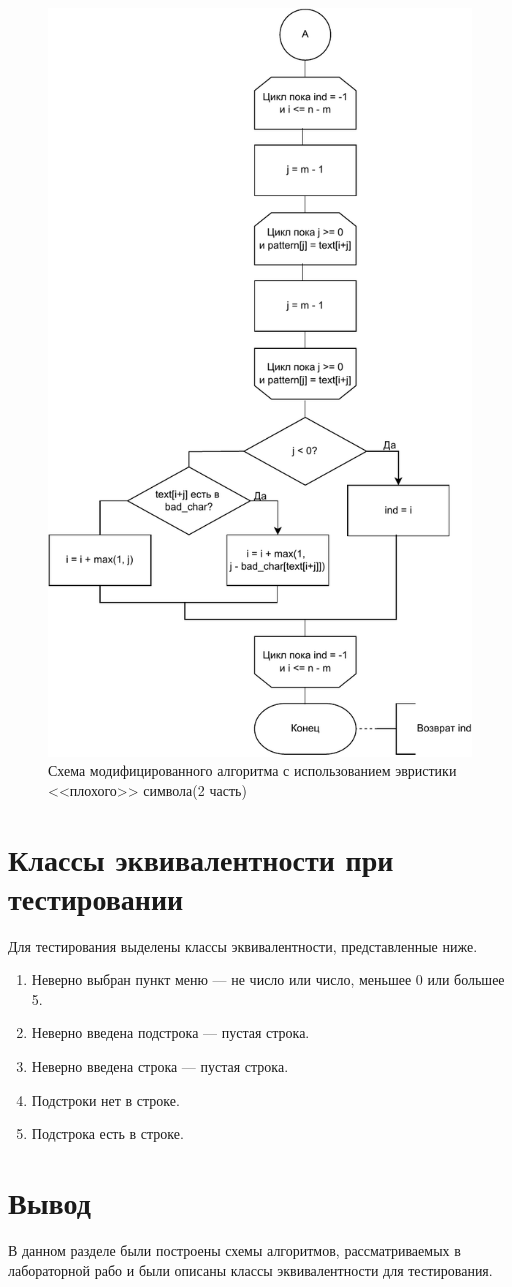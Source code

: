 \begin{figure}[h!]
	\centering
	\includegraphics[width=0.8\linewidth]{img/bm2}
	\caption{Схема модифицированного алгоритма с использованием эвристики <<плохого>> символа(2 часть)}
	\label{fig:bm2}
\end{figure}
\clearpage


\section{Классы эквивалентности при тестировании}

Для тестирования выделены классы эквивалентности, представленные ниже.

\begin{enumerate}[label=\arabic*)]
	\item Неверно выбран пункт меню --- не число или число, меньшее 0 или большее 5.
	\item Неверно введена подстрока --- пустая строка.
	\item Неверно введена строка --- пустая строка.
	\item Подстроки нет в строке.
	\item Подстрока есть в строке.
\end{enumerate}


\section{Вывод}

В данном разделе были построены схемы алгоритмов, рассматриваемых в лабораторной рабо и были описаны классы эквивалентности для тестирования.
